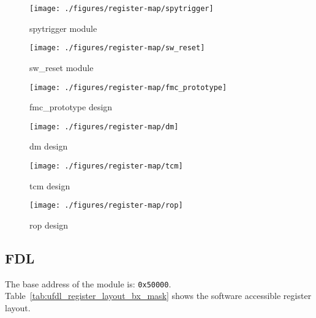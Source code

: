 \begin{figure}[ht]
  \texttt{[image: ./figures/register-map/spytrigger]}
  \caption{spytrigger module}
  \label{fig:spytrigger modules}
\end{figure}

\begin{figure}[ht]
  \texttt{[image: ./figures/register-map/sw\_reset]}
  \caption{sw\_reset module}
  \label{fig:sw.reset modules}
\end{figure}

\begin{figure}[ht]
  \texttt{[image: ./figures/register-map/fmc\_prototype]}
  \caption{fmc\_prototype design }
  \label{fig:fmc.prototype modules}
\end{figure}

\begin{figure}[ht]
  \texttt{[image: ./figures/register-map/dm]}
  \caption{dm design }
  \label{fig:dm modules}
\end{figure}

\begin{figure}[ht]
  \texttt{[image: ./figures/register-map/tcm]}
  \caption{tcm design }
  \label{fig:tcm modules}
\end{figure}

\begin{figure}[ht]
  \texttt{[image: ./figures/register-map/rop]}
  \caption{rop design }
  \label{fig:rop modules}
\end{figure}

\subsection{FDL}

The base address of the \ufdl module is: \verb|0x50000|.
Table~\ref{tab:ufdl_register_layout_bx_mask} shows the software accessible register layout.

